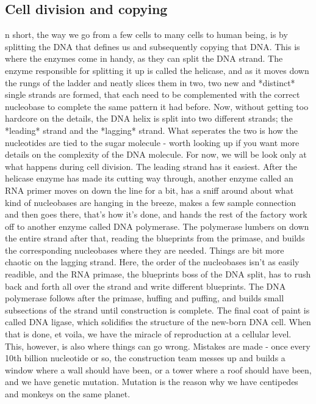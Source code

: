 \subsection*{Cell division and copying}
n short, the way we go from a few cells to many cells to human being, is by splitting the DNA that defines us and subsequently copying that DNA. This is where the enzymes come in handy, as they can split the DNA strand. The enzyme responsible for splitting it up is called the helicase, and as it moves down the rungs of the ladder and neatly slices them in two, two new and *distinct* single strands are formed, that each need to be complemented with the correct nucleobase to complete the same pattern it had before. Now, without getting too hardcore on the details, the DNA helix is split into two different strands; the *leading* strand and the *lagging* strand. What seperates the two is how the nucleotides are tied to the sugar molecule - worth looking up if you want more details on the complexity of the DNA molecule. For now, we will be look only at what happens during cell division.
The leading strand has it easiest. After the helicase enzyme has made its cutting way through, another enzyme called an RNA primer moves on down the line for a bit, has a sniff around about what kind of nucleobases are hanging in the breeze, makes a few sample connection and then goes there, that's how it's done, and hands the rest of the factory work off to another enzyme called DNA polymerase. The polymerase lumbers on down the entire strand after that, reading the blueprints from the primase, and builds the corresponding nucleobases where they are needed. 
Things are bit more chaotic on the lagging strand. Here, the order of the nucleobases isn't as easily readible, and the RNA primase, the blueprints boss of the DNA split, has to rush back and forth all over the strand and write different blueprints. The DNA polymerase follows after the primase, huffing and puffing, and builds small subsections of the strand until construction is complete.
The final coat of paint is called DNA ligase, which solidifies the structure of the new-born DNA cell. When that is done, et voila, we have the miracle of reproduction at a cellular level. 
This, however, is also where things can go wrong. Mistakes are made - once every 10th billion nucleotide or so, the construction team messes up and builds a window where a wall should have been, or a tower where a roof should have been, and we have genetic mutation. Mutation is the reason why we have centipedes and monkeys on the same planet. 

